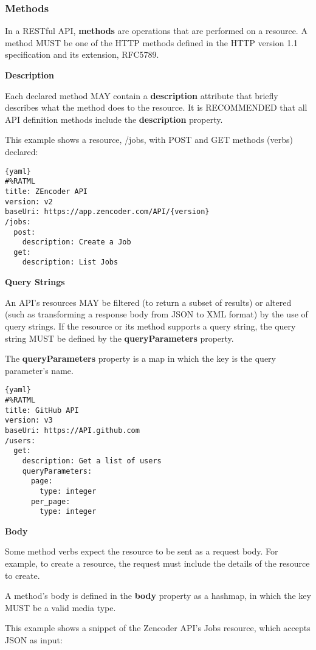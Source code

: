 \subsubsection{Methods}

In a RESTful API, \textbf{methods} are operations that are performed on a resource. A method MUST be one of the HTTP methods defined in the HTTP version 1.1 specification and its extension, RFC5789.

\textbf{Description}

Each declared method MAY contain a \textbf{description} attribute that briefly describes what the method does to the resource. It is RECOMMENDED that all API definition methods include the \textbf{description} property.

This example shows a resource, /jobs, with POST and GET methods (verbs) declared:

\begin{lstlisting}{yaml}
#%RATML
title: ZEncoder API
version: v2
baseUri: https://app.zencoder.com/API/{version}
/jobs:
  post:
    description: Create a Job
  get:
    description: List Jobs
\end{lstlisting}

\textbf{Query Strings}

An API's resources MAY be filtered (to return a subset of results) or altered (such as transforming a response body from JSON to XML format) by the use of query strings. If the resource or its method supports a query string, the query string MUST be defined by the \textbf{queryParameters} property.

The \textbf{queryParameters} property is a map in which the key is the query parameter's name.

\begin{lstlisting}{yaml}
#%RATML
title: GitHub API
version: v3
baseUri: https://API.github.com
/users:
  get:
    description: Get a list of users
    queryParameters:
      page:
        type: integer
      per_page:
        type: integer
\end{lstlisting}

\textbf{Body}

Some method verbs expect the resource to be sent as a request body. For example, to create a resource, the request must include the details of the resource to create.


A method's body is defined in the \textbf{body} property as a hashmap, in which the key MUST be a valid media type.

This example shows a snippet of the Zencoder API's Jobs resource, which accepts JSON as input:

